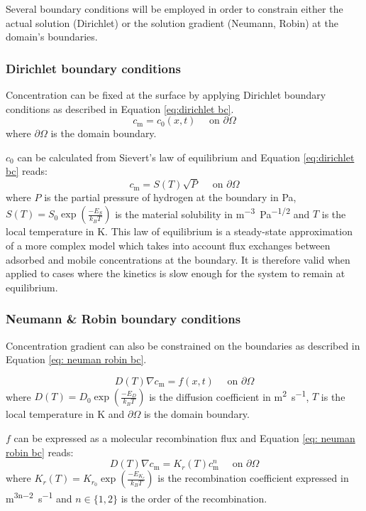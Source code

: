 Several boundary conditions will be employed in order to constrain either the actual solution (Dirichlet) or the solution gradient (Neumann, Robin) at the domain's boundaries.

\subsubsection{Dirichlet boundary conditions}

Concentration can be fixed at the surface by applying Dirichlet boundary conditions as described in Equation \ref{eq:dirichlet bc}.
\begin{equation}
    c_\mathrm{m} = c_0(x, t) \quad \text { on } \partial \Omega
    \label{eq:dirichlet bc}
\end{equation}
where $\partial \Omega$ is the domain boundary.

$c_0$ can be calculated from Sievert's law of equilibrium and Equation \ref{eq:dirichlet bc} reads:
\begin{equation}
    c_\mathrm{m} = S(T) \sqrt{P}\quad \text { on } \partial \Omega
\end{equation}
where $P$ is the partial pressure of hydrogen at the boundary in \si{Pa}, $S(T)=S_0 \exp(\frac{-E_S}{k_B T})$ is the material solubility in \si{m^{-3}.Pa^{-1/2}} and $T$ is the local temperature in \si{K}.
This law of equilibrium is a steady-state approximation of a more complex model which takes into account flux exchanges between adsorbed and mobile concentrations at the boundary.
It is therefore valid when applied to cases where the kinetics is slow enough for the system to remain at equilibrium.

\subsubsection{Neumann \& Robin boundary conditions}

Concentration gradient can also be constrained on the boundaries as described in Equation \ref{eq: neuman robin bc}.

\begin{equation}
    D(T)\nabla c_\mathrm{m} = f(x, t) \quad \text { on } \partial \Omega
    \label{eq: neuman robin bc}
\end{equation}
where $D(T) = D_0 \exp(\frac{-E_D}{k_B T}) $ is the diffusion coefficient in \si{m^2.s^{-1}}, $T$ is the local temperature in \si{K} and $\partial \Omega$ is the domain boundary.

$f$ can be expressed as a molecular recombination flux and Equation \ref{eq: neuman robin bc} reads:
\begin{equation}
    D(T)\nabla c_\mathrm{m} = K_r(T) c_\mathrm{m}^n \quad \text { on } \partial \Omega
\end{equation}
where $K_r(T) = K_{r_0} \exp(\frac{-E_{K_r}}{k_B T}) $ is the recombination coefficient expressed in \si{m^{3n-2}.s^{-1}} and $n \in \{1, 2\}$ is the order of the recombination.


